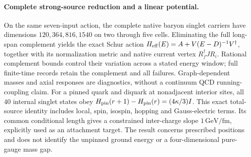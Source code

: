 \paragraph{Complete strong-source reduction and a linear potential.}
On the same seven-input action, the complete native baryon singlet carriers
have dimensions $120,364,816,1540$ on two through five cells. Eliminating the
full long-span complement yields the exact Schur action
$H_{\rm eff}(E)=A+V(E-D)^{-1}V^\dagger$, together with its normalization
metric and native current vertex $R_f^\dagger J R_i$.
Rational complement bounds control their variation across a stated energy
window; full finite-time records retain the complement and all failures.
Graph-dependent masses and axial responses are diagnostics, without a
continuum QCD running-coupling claim.
For a pinned quark and diquark at nonadjacent interior sites, all $40$
internal singlet states obey
$H_{\rm pin}(r+1)-H_{\rm pin}(r)=(4\kappa/3)I$.
This exact total-source identity includes local, spin, isospin, hopping and
Gauss-electric terms. Its common conditional length gives a constrained
inter-charge slope $1\,\mathrm{GeV/fm}$, explicitly used as an attachment
target. The result concerns prescribed positions and does not identify the
unpinned ground energy or a four-dimensional pure-gauge mass gap.
